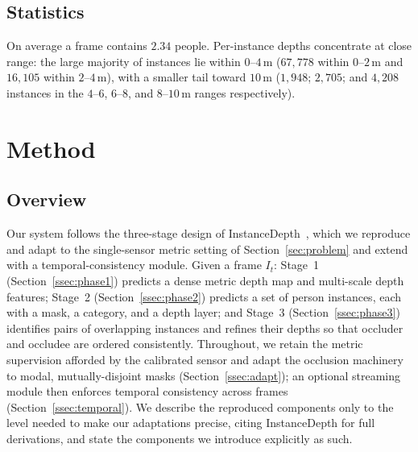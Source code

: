 \documentclass[sigconf, review=true]{acmart}
\begin{document}
\subsection{Statistics}
On average a frame contains $2.34$ people. Per-instance depths concentrate at
close range: the large majority of instances lie within $0$--$4\,$m
($67{,}778$ within $0$--$2\,$m and $16{,}105$ within $2$--$4\,$m), with a
smaller tail toward $10\,$m ($1{,}948$; $2{,}705$; and $4{,}208$ instances in
the $4$--$6$, $6$--$8$, and $8$--$10\,$m ranges respectively).


\section{Method}
\label{sec:method}

\subsection{Overview}
Our system follows the three-stage design of
InstanceDepth~\cite{liang2025instancedepth}, which we reproduce and adapt to the
single-sensor metric setting of Section~\ref{sec:problem} and extend with a
temporal-consistency module. Given a frame $I_t$: Stage~1
(Section~\ref{ssec:phase1}) predicts a dense metric depth map and multi-scale
depth features; Stage~2 (Section~\ref{ssec:phase2}) predicts a set of person
instances, each with a mask, a category, and a depth layer; and Stage~3
(Section~\ref{ssec:phase3}) identifies pairs of overlapping instances and
refines their depths so that occluder and occludee are ordered consistently.
Throughout, we retain the metric supervision afforded by the calibrated sensor
and adapt the occlusion machinery to modal, mutually-disjoint masks
(Section~\ref{ssec:adapt}); an optional streaming module then enforces temporal
consistency across frames (Section~\ref{ssec:temporal}). We describe the
reproduced components only to the level needed to make our adaptations precise,
citing InstanceDepth for full derivations, and state the components we introduce
explicitly as such.
\end{document}
